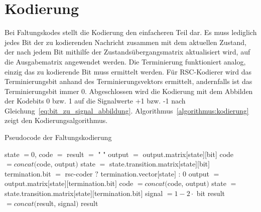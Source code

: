 \section{Kodierung}
\label{kapitel:implementierung_kodierung}
Bei Faltungskodes stellt die Kodierung den einfacheren Teil dar. Es muss lediglich jedes Bit der zu kodierenden Nachricht zusammen mit dem aktuellen Zustand, der nach jedem Bit mithilfe der Zustandsübergangsmatrix aktualisiert wird, auf die Ausgabematrix angewendet werden. Die Terminierung funktioniert analog, einzig das zu kodierende Bit muss ermittelt werden. Für RSC-Kodierer wird das Terminierungsbit anhand des Terminierungsvektors ermittelt, andernfalls ist das Terminierungsbit immer 0. Abgeschlossen wird die Kodierung mit dem Abbilden der Kodebits 0 bzw. 1 auf die Signalwerte +1 bzw. -1 nach Gleichung~\eqref{eq:bit_zu_signal_abbildung}. Algorithmus~\ref{algorithmus:kodierung} zeigt den Kodierungsalgorithmus.
\begin{algorithm}[H]
\renewcommand{\algorithmicforall}{\textbf{for each}}
\caption{Pseudocode der Faltungskodierung}
\label{algorithmus:kodierung}
\begin{algorithmic}[1]
\STATE state $=0$, code $=$ result $=$ " "
   \STATE output $=$ output.matrix[state][bit]
	\STATE code $=\mathit{concat}($code, output$)$
	\STATE state $=$ state.transition.matrix$[$state$][$bit$]$
\ENDFOR
{}
      \STATE termination.bit $=$ rsc-coder $?$ termination.vector$[$state$]$ : $0$
      \STATE output $=$ output.matrix$[$state$][$termination.bit$]$
	   \STATE code $=\mathit{concat}($code, output$)$
	   \STATE state $=$ state.transition.matrix$[$state$][$termination.bit$]$
   \ENDFOR
\ENDIF
{}
   \STATE signal $=1-2\cdot$ bit
   \STATE result $=\mathit{concat}($result, signal$)$
\ENDFOR
\RETURN result
\end{algorithmic}
\end{algorithm}

